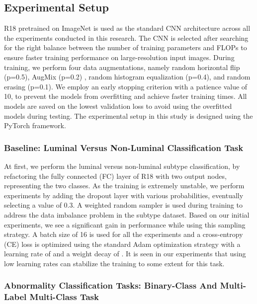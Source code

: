\documentclass{article}
\begin{document}
\subsection{Experimental Setup}
 

R18 pretrained on ImageNet is used as the standard CNN architecture across all the experiments conducted in this research. The CNN is selected after searching for the right balance between the number of training parameters and FLOPs to ensure faster training performance on large-resolution input images. During training, we perform four data augmentations, namely random horizontal flip (p=0.5), AugMix (p=0.2) \cite{hendrycks2019augmix}, random histogram equalization (p=0.4), and random erasing (p=0.1). We employ an early stopping criterion with a patience value of 10, to prevent the models from overfitting and achieve faster training times. All models are saved on the lowest validation loss to avoid using the overfitted models during testing. The experimental setup in this study is designed using the PyTorch framework.  

  

\subsubsection{Baseline: Luminal Versus Non-Luminal Classification Task}  

  

\label {sub:baseline}  

  

At first, we perform the luminal versus non-luminal subtype classification, by refactoring the fully connected (FC) layer of R18 with two output nodes, representing the two classes. As the training is extremely unstable, we perform experiments by adding the dropout layer with various probabilities, eventually selecting a value of 0.3. A weighted random sampler is used during training to address the data imbalance problem in the subtype dataset. Based on our initial experiments, we see a significant gain in performance while using this sampling strategy. A batch size of 16 is used for all the experiments and a cross-entropy (CE) loss is optimized using the standard Adam optimization strategy with a learning rate of  and a weight decay of . It is seen in our experiments that using low learning rates can stabilize the training to some extent for this task.  

  

\subsubsection {Abnormality Classification Tasks: Binary-Class And Multi-Label Multi-Class Task}  
\end{document}
